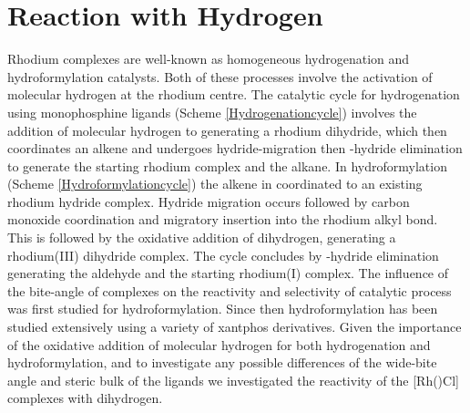 \section{Reaction with Hydrogen}
\label{section:rhodiumhydride}

Rhodium complexes are well-known as homogeneous hydrogenation and hydroformylation catalysts.  Both of these processes involve the activation of molecular hydrogen at the rhodium centre.  The catalytic cycle for hydrogenation using monophosphine ligands (Scheme \ref{Hydrogenationcycle}) involves the addition of molecular hydrogen to \ce{[Rh(PR3)2Cl]} generating a rhodium dihydride, which then coordinates an alkene and undergoes hydride-migration then \chembeta-hydride elimination to generate the starting rhodium complex and the alkane. In hydroformylation (Scheme \ref{Hydroformylationcycle}) the alkene in coordinated to an existing rhodium hydride complex.  Hydride migration occurs followed by carbon monoxide coordination and migratory insertion into the rhodium alkyl bond.  This is followed by the oxidative addition of dihydrogen, generating a rhodium(III) dihydride complex.  The cycle concludes by \chembeta-hydride elimination generating the aldehyde and the starting rhodium(I) complex.  The influence of the bite-angle of \Phxantphos{} complexes on the reactivity and selectivity of catalytic process was first studied for hydroformylation.\cite{Kranenburg1995}  Since then hydroformylation has been studied extensively using a variety of xantphos derivatives.\cite{Bronger2002, Bronger2003, Bronger2004, Bronger2004b, Bronger2004c, Buhling1997, Buhling1997b, Dieleman2001, Dierkes1999, Freixa2003, Goedheijt1998b, Kamer2001, Leclercq2005, Leeuwen1999, Leeuwen2000, Mora2007, Sandee1999, Silva2003, Veen1999, Veen2000, Vlugt2004, Zuidema2007, Zuidema2008, Zuidema2010}  Given the importance of the oxidative addition of molecular hydrogen for both hydrogenation and hydroformylation, and to investigate any possible differences of the wide-bite angle and steric bulk of the \tBuxantphos{} ligands we investigated the reactivity of the [Rh(\tBuxantphosk)Cl] complexes with dihydrogen.  


